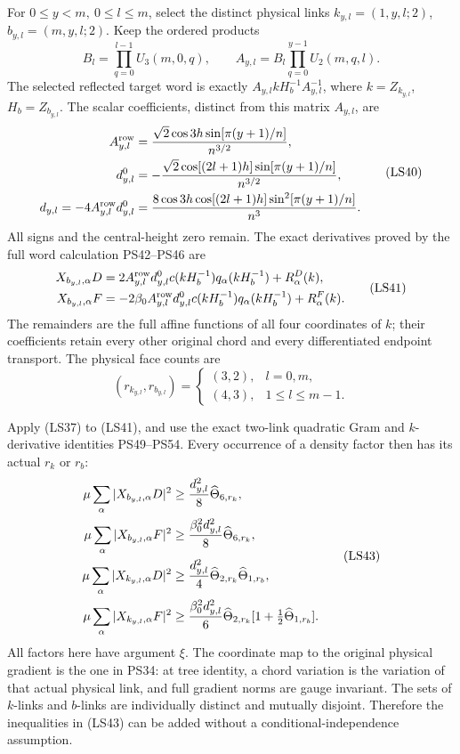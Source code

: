 \documentclass[11pt]{article}
\begin{document}
For \(0\le y<m,\ 0\le l\le m\), select the distinct physical
links \(k_{y,l}=(1,y,l;2)\), \(b_{y,l}=(m,y,l;2)\).
Keep the ordered products
\[
 B_l=\prod_{q=0}^{l-1}U_3(m,0,q),\qquad
 A_{y,l}=B_l\prod_{q=0}^{y-1}U_2(m,q,l).
 \]
The selected reflected target word is exactly
\(A_{y,l}kH_b^{-1}A_{y,l}^{-1}\), where
\(k=Z_{k_{y,l}}\), \(H_b=Z_{b_{y,l}}\).
The scalar coefficients, distinct from this matrix \(A_{y,l}\),
are
\[
 \begin{aligned}
 A^{\rm row}_{y,l}
   &={\sqrt2\cos3h\sin[\pi(y+1)/n]\over n^{3/2}},\\
 d^0_{y,l}
   &=-{\sqrt2\cos[(2l+1)h]\sin[\pi(y+1)/n]\over n^{3/2}},\\
 d_{y,l}=-4A^{\rm row}_{y,l}d^0_{y,l}
   &={8\cos3h\cos[(2l+1)h]\sin^2[\pi(y+1)/n]\over n^3}.
 \end{aligned}
 \tag{LS40}
\]
All signs and the central-height zero remain.
The exact derivatives proved by the full word calculation
PS42–PS46 are
\[
 \begin{aligned}
 X_{b_{y,l},\alpha}D
  &=2A^{\rm row}_{y,l}d^0_{y,l}
       c(kH_b^{-1})q_\alpha(kH_b^{-1})+R_\alpha^D(k),\\
 X_{b_{y,l},\alpha}F
  &=-2\beta_0A^{\rm row}_{y,l}d^0_{y,l}
       c(kH_b^{-1})q_\alpha(kH_b^{-1})+R_\alpha^F(k).
 \end{aligned}
 \tag{LS41}
\]
The remainders are the full affine functions of all four
coordinates of \(k\); their coefficients retain every other
original chord and every differentiated endpoint transport.
The physical face counts are
\[
 (r_{k_{y,l}},r_{b_{y,l}})
 =\begin{cases}(3,2),&l=0,m,\\(4,3),&1\le l\le m-1.\end{cases}
 \tag{LS42}
\]

Apply (LS37) to (LS41), and use the exact two-link quadratic Gram
and \(k\)-derivative identities PS49–PS54. Every occurrence of
a density factor then has its actual \(r_k\) or \(r_b\):
\[
 \begin{aligned}
 \mu\sum_\alpha|X_{b_{y,l},\alpha}D|^2
   &\ge{d_{y,l}^2\over8}\widehat\Theta_{6,r_k},\\
 \mu\sum_\alpha|X_{b_{y,l},\alpha}F|^2
   &\ge{\beta_0^2d_{y,l}^2\over8}\widehat\Theta_{6,r_k},\\
 \mu\sum_\alpha|X_{k_{y,l},\alpha}D|^2
   &\ge{d_{y,l}^2\over4}
                    \widehat\Theta_{2,r_k}\widehat\Theta_{1,r_b},\\
 \mu\sum_\alpha|X_{k_{y,l},\alpha}F|^2
   &\ge{\beta_0^2d_{y,l}^2\over6}\widehat\Theta_{2,r_k}
                                     [1+\tfrac12\widehat\Theta_{1,r_b}].
 \end{aligned}
 \tag{LS43}
\]
All factors here have argument \(\xi\). The coordinate map to
the original physical gradient is the one in PS34: at tree
identity, a chord variation is the variation of that actual
physical link, and full gradient norms are gauge invariant.
The sets of \(k\)-links and \(b\)-links are individually distinct
and mutually disjoint. Therefore the inequalities in (LS43)
can be added without a conditional-independence assumption.
\end{document}
